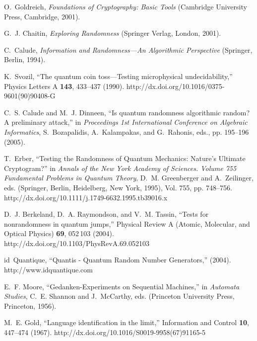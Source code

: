 \documentclass[12pt]{article}
\begin{document}
\begin{thebibliography}{10}
O.~Goldreich, {\em Foundations of Cryptography: Basic Tools\/} (Cambridge
  University Press, Cambridge, 2001).

G.~J. Chaitin, {\em Exploring Randomness\/} (Springer Verlag, London, 2001).

C.~Calude, {\em Information and Randomness---An Algorithmic Perspective\/}
  (Springer, Berlin, 1994).

K.~Svozil, \enquote{The quantum coin toss---Testing microphysical
  undecidability,} Physics Letters A {\bf 143}, 433--437 (1990).
\newline http://dx.doi.org/10.1016/0375-9601(90)90408-G

C.~S. Calude and M.~J. Dinneen, \enquote{Is quantum randomness algorithmic
  random? A preliminary attack,} in {\em Proceedings 1st International
  Conference on Algebraic Informatics\/}, S.~Bozapalidis, A.~Kalampakas, and
  G.~Rahonis, eds.,  pp. 195--196 (2005).

T.~Erber, \enquote{Testing the Randomness of Quantum Mechanics: Nature's
  Ultimate Cryptogram?} in {\em Annals of the New York Academy of Sciences.
  {V}olume 755 Fundamental Problems in Quantum Theory\/}, D.~M. Greenberger and
  A.~Zeilinger, eds.  (Springer, Berlin, Heidelberg, New York, 1995), Vol. 755,
  pp. 748--756.
\newline http://dx.doi.org/10.1111/j.1749-6632.1995.tb39016.x

D.~J. Berkeland, D.~A. Raymondson, and V.~M. Tassin, \enquote{Tests for
  nonrandomness in quantum jumps,} Physical Review A (Atomic, Molecular, and
  Optical Physics) {\bf 69}, 052\,103 (2004).
\newline http://dx.doi.org/10.1103/PhysRevA.69.052103

id~Quantique, \enquote{Quantis - Quantum Random Number Generators,}  (2004).
\newline http://www.idquantique.com

E.~F. Moore, \enquote{Gedanken-Experiments on Sequential Machines,} in {\em
  Automata Studies\/}, C.~E. Shannon and J.~McCarthy, eds.  (Princeton
  University Press, Princeton, 1956).

M.~E. Gold, \enquote{Language identification in the limit,} Information and
  Control {\bf 10}, 447--474 (1967).
\newline http://dx.doi.org/10.1016/S0019-9958(67)91165-5


\end{thebibliography}
\end{document}
